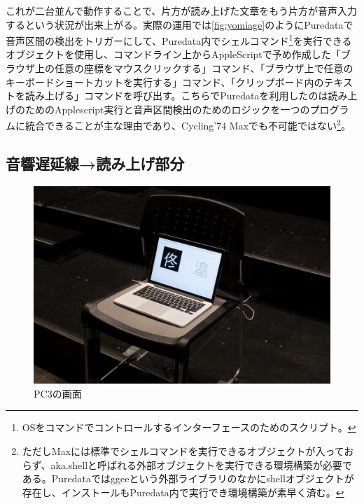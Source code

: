 \documentclass[a4paper,report]{jsbook}
\begin{document}
これが二台並んで動作することで、片方が読み上げた文章をもう片方が音声入力するという状況が出来上がる。実際の運用では\cref{fig:yomiage}のようにPuredataで音声区間の検出をトリガーにして、Puredata内でシェルコマンド\footnote{OSをコマンドでコントロールするインターフェースのためのスクリプト。}を実行できるオブジェクトを使用し、コマンドライン上からAppleScriptで予め作成した「ブラウザ上の任意の座標をマウスクリックする」コマンド、「ブラウザ上で任意のキーボードショートカットを実行する」コマンド、「クリップボード内のテキストを読み上げる」コマンドを呼び出す。こちらでPuredataを利用したのは読み上げのためのApplescript実行と音声区間検出のためのロジックを一つのプログラムに統合できることが主な理由であり、Cycling'74
Maxでも不可能ではない\footnote{ただしMaxには標準でシェルコマンドを実行できるオブジェクトが入っておらず、aka.shellと呼ばれる外部オブジェクトを実行できる環境構築が必要である。Puredataではggeeという外部ライブラリのなかにshellオブジェクトが存在し、インストールもPuredata内で実行でき環境構築が素早く済む。}。

\subsection{音響遅延線→読み上げ部分}\label{ux97f3ux97ffux9045ux5ef6ux7ddaux8aadux307fux4e0aux3052ux90e8ux5206}

\begin{no-prefix-figure-caption}

\begin{figure}[htbp]
\centering
\includegraphics[width=1.00000\textwidth]{./img/adm2_archive5.jpg}
\caption{PC3の画面}
\end{figure}

\end{no-prefix-figure-caption}
\end{document}

